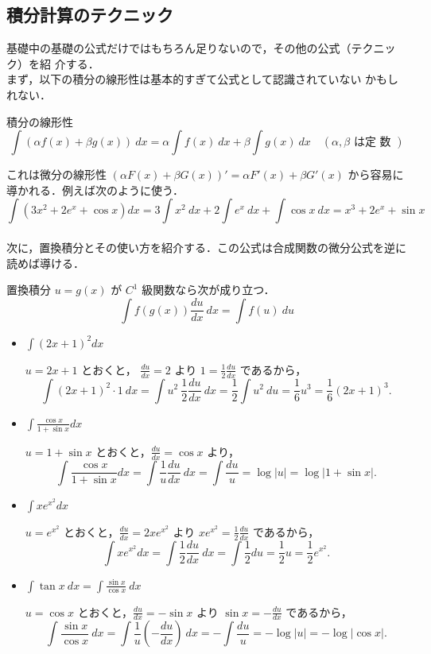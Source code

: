 \documentclass[10pt, uplatex, dvipdfmx]{jsarticle}
\theoremstyle{definition}
\numberwithin{equation}{section}
\newcommand{\ds}{\displaystyle}
\begin{document}
\subsection{積分計算のテクニック}

基礎中の基礎の公式だけではもちろん足りないので，その他の公式（テクニック）を紹
介する．\\

まず，以下の積分の線形性は基本的すぎて公式として認識されていない
かもしれない．
\begin{itembox}[l]{積分の線形性}
  \[
    \int \left( \alpha f(x) + \beta g(x) \right) \ dx = \alpha \int
    f(x) \ dx + \beta \int g(x) \ dx \quad (\alpha, \beta \text{ は定
      数 } )
  \]
\end{itembox}
これは微分の線形性
$\left( \alpha F(x) + \beta G(x) \right)' = \alpha F'(x) + \beta
G'(x)$ から容易に導かれる．例えば次のように使う．
\[
  \int \left( 3x^2 + 2e^x + \cos x \right) dx
  = 3 \int x^2 \ dx + 2 \int e^x \ dx + \int \cos x \ dx 
  = x^3  + 2 e^x + \sin x 
\]\\


次に，置換積分とその使い方を紹介する．この公式は合成関数の微分公式を逆に読めば導ける．
\begin{itembox}[l]{置換積分}
$u=g(x)$ が $C^1$ 級関数なら次が成り立つ．
$$ \int f \left( g(x) \right ) \frac{du}{dx}\ dx  =\int f (u) \  du $$
\end{itembox}



\begin{itemize}
  \setlength{\itemsep}{1zh}
  
\item $\ds \int (2x+1)^2 dx$

  $u=2x+1$ とおくと， $\frac{du}{dx} = 2$ より $1 = \frac{1}{2} \frac{du}{dx}$ であるから，
  \[
    \int (2x+1)^2 \cdot 1 \ dx = \int u^2 \  \frac{1}{2} \frac{du}{dx} \  dx 
    =  \frac{1}{2} \int u^2 \ du =  \frac{1}{6} u^3  = \frac{1}{6}(2x+1)^3 .
  \]

\item $\ds \int \frac{\cos x}{1+\sin x}dx$

  $u=1+ \sin x$ とおくと，$\frac{du}{dx}=\cos x$ より， 
  \[
    \int \frac{\cos x}{1+\sin x}dx = \int \frac{1}{u} \frac{du}{dx} \ dx = 
    \int \frac{du}{u} = \log |u|  =
    \log | 1+ \sin x | .
  \]

\item $\ds \int xe^{x^2}dx$

  $u=e^{x^2}$ とおくと，$\frac{du}{dx}=2x e^{x^2}$ より $xe^{x^2} = \frac{1}{2} \frac{du}{dx}$ であるから，
  \[
    \int xe^{x^2}dx = \int \frac{1}{2} \frac{du}{dx} \ dx  = \int \frac{1}{2} du
    =\frac{1}{2}u=\frac{1}{2}e^{x^2}.
  \]

\item $\ds \int \tan x \ dx = \int \frac{\sin x}{\cos x} \ dx$

  $u=\cos x$ とおくと，$\frac{du}{dx} = -\sin x$ より $\sin x = - \frac{du}{dx}$ であるから，
  \[
    \int \frac{\sin x}{\cos x} \ dx = \int \frac{1}{u} \left(- \frac{du}{dx} \right) \ dx
    = -\int \frac{du}{u} = -\log|u|  = -\log| \cos x | .
  \]
\end{itemize}
\end{document}

